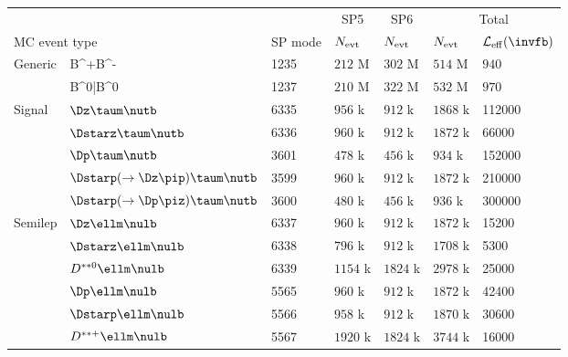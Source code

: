 \begin{tabular}{ l l l l l l l } \hline\hline
\multicolumn{3}{l}{} & \multicolumn{1}{c}{SP5} & \multicolumn{1}{c}{SP6} & \multicolumn{2}{c}{Total} \\
\multicolumn{2}{l}{MC event type} & SP mode & $N_{\rm evt}$  & $N_{\rm evt}$ & $N_{\rm evt}$ & $\mathcal L_{\rm eff} (\invfb )$ \\ \hline
Generic  & B^+B^-                          & 1235 & $212$ M & $302$ M & $514$ M & $940$ \\
         & B^0\bar{B^0}                         & 1237 & $210$ M & $322$ M & $532$ M & $970$ \\
Signal   & $\Dz\taum\nutb$                 & 6335 & $956$ k & $912$ k & $1868$ k & 112000  \\
         & $\Dstarz\taum\nutb$             & 6336 & $960$ k & $912$ k & $1872$ k & 66000  \\
         & $\Dp\taum\nutb$                 & 3601 & $478$ k & $456$ k & $934$ k & 152000  \\
         & $\Dstarp(\to\Dz\pip)\taum\nutb$ & 3599 & $960$ k & $912$ k & $1872$ k & 210000  \\
         & $\Dstarp(\to\Dp\piz)\taum\nutb$ & 3600 & $480$ k & $456$ k & $936$ k & 300000  \\
Semilep  & $\Dz\ellm\nulb$                  & 6337 & $960$ k & $912$ k & $1872$ k & 15200  \\
         & $\Dstarz\ellm\nulb$              & 6338 & $796$ k & $912$ k & $1708$ k & 5300  \\
         & $D^{**0}\ellm\nulb$              & 6339 & $1154$ k & $1824$ k & $2978$ k & 25000  \\
         & $\Dp\ellm\nulb$                  & 5565 & $960$ k & $912$ k &  $1872$ k & 42400  \\
         & $\Dstarp\ellm\nulb$              & 5566 & $958$ k & $912$ k &  $1870$ k & 30600  \\
         & $D^{**+}\ellm\nulb$              & 5567 & $1920$ k & $1824$ k & $3744$ k & 16000 \\ \hline\hline
\end{tabular}

